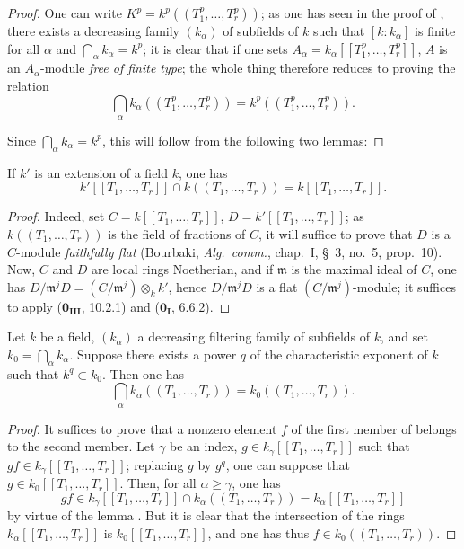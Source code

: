 \begin{proof}
One can write $K^p=k^p((T_1^p,\ldots,T_r^p))$; as one has seen in the proof of , there exists a decreasing family $(k_\alpha)$ of subfields of $k$ such that $[k:k_\alpha]$ is finite for all $\alpha$ and $\bigcap_\alpha k_\alpha=k^p$; it is clear that if one sets $A_\alpha=k_\alpha[[T_1^p,\ldots,T_r^p]]$, $A$ is an $A_\alpha$-module \emph{free of finite type}; the whole thing therefore reduces to proving the relation
\begin{equation}
\tag{21.8.8.1}
  \label{0.21.8.8.1}
  \bigcap_\alpha k_\alpha((T_1^p,\ldots,T_r^p))=k^p((T_1^p,\ldots,T_r^p)).
\end{equation}

Since $\bigcap_\alpha k_\alpha=k^p$, this will follow from the following two lemmas:
\end{proof}

\begin{lemma}[21.8.8.2]
\label{0.21.8.8.2}
If $k'$ is an extension of a field $k$, one has
\[
  k'[[T_1,\ldots,T_r]]\cap k((T_1,\ldots,T_r))=k[[T_1,\ldots,T_r]].
\]
\end{lemma}

\begin{proof}
Indeed, set $C=k[[T_1,\ldots,T_r]]$, $D=k'[[T_1,\ldots,T_r]]$; as $k((T_1,\ldots,T_r))$ is the field of fractions of $C$, it will suffice to prove that $D$ is a $C$-module \emph{faithfully flat} (Bourbaki, \emph{Alg.\ comm.}, chap.~I, \S~3, no.~5, prop.~10).
Now, $C$ and $D$ are local rings Noetherian, and if $\mathfrak{m}$ is the maximal ideal of $C$, one has $D/\mathfrak{m}^j D=(C/\mathfrak{m}^j)\otimes_k k'$, hence $D/\mathfrak{m}^j D$ is a flat $(C/\mathfrak{m}^j)$-module; it suffices to apply ($\mathbf{0_{III}}$, 10.2.1) and ($\mathbf{0_I}$, 6.6.2).
\end{proof}

\begin{lemma}[21.8.8.3]
\label{0.21.8.8.3}
Let $k$ be a field, $(k_\alpha)$ a decreasing filtering family of subfields of $k$, and set $k_0=\bigcap_\alpha k_\alpha$.
Suppose there exists a power $q$ of the characteristic exponent of $k$ such that $k^q\subset k_0$.
Then one has
\begin{equation}
\tag{21.8.8.4}
  \label{0.21.8.8.4}
  \bigcap_\alpha k_\alpha((T_1,\ldots,T_r))=k_0((T_1,\ldots,T_r)).
\end{equation}
\end{lemma}

\begin{proof}
It suffices to prove that a nonzero element $f$ of the first member of  belongs to the second member.
Let $\gamma$ be an index, $g\in k_\gamma[[T_1,\ldots,T_r]]$ such that $gf\in k_\gamma[[T_1,\ldots,T_r]]$; replacing $g$ by $g^q$, one can suppose that $g\in k_0[[T_1,\ldots,T_r]]$.
Then, for all $\alpha\geqslant\gamma$, one has
\[
  gf\in k_\gamma[[T_1,\ldots,T_r]]\cap k_\alpha((T_1,\ldots,T_r))=k_\alpha[[T_1,\ldots,T_r]]
\]
by virtue of the lemma .
But it is clear that the intersection of the rings $k_\alpha[[T_1,\ldots,T_r]]$ is $k_0[[T_1,\ldots,T_r]]$, and one has thus $f\in k_0((T_1,\ldots,T_r))$.
\end{proof}

